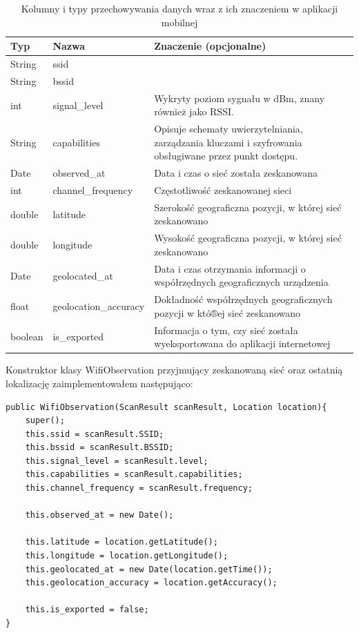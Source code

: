 \begin{table}
\caption{Kolumny i typy przechowywania danych wraz z ich znaczeniem w aplikacji mobilnej}
\label{table:mobiledbscheme}
\begin{tabular} { |l|l|p{7cm}|  }
\hline
Typ & Nazwa & Znaczenie (opcjonalne) \\
\hline
\hline
String & ssid & \\
\hline
String & bssid & \\
\hline
int & signal\_level & Wykryty poziom sygnału w dBm, znany również jako RSSI.\cite{scanResultAndroidDocs} \\
\hline
String & capabilities & Opisuje schematy uwierzytelniania, zarządzania kluczami i szyfrowania obsługiwane przez punkt dostępu.\cite{scanResultAndroidDocs} \\
\hline
Date & observed\_at & Data i czas o sieć została zeskanowana \\
\hline
int & channel\_frequency & Częstotliwość zeskanowanej sieci \\
\hline
double & latitude & Szerokość geograficzna pozycji, w której sieć zeskanowano \\
\hline
double & longitude & Wysokość geograficzna pozycji, w której sieć zeskanowano \\
\hline
Date & geolocated\_at & Data i czas otrzymania informacji o współrzędnych geograficznych urządzenia \\
\hline
float & geolocation\_accuracy & Dokładność współrzędnych geograficznych pozycji w któ®ej sieć zeskanowano \\
\hline
boolean & is\_exported & Informacja o tym, czy sieć została wyeksportowana do aplikacji internetowej \\
\hline
\end{tabular}
\end{table}

Konstruktor klasy WifiObservation przyjmujący zeskanowaną sieć oraz ostatnią lokalizację zaimplementowałem następująco:
\begin{verbatim}
public WifiObservation(ScanResult scanResult, Location location){
    super();
    this.ssid = scanResult.SSID;
    this.bssid = scanResult.BSSID;
    this.signal_level = scanResult.level;
    this.capabilities = scanResult.capabilities;
    this.channel_frequency = scanResult.frequency;

    this.observed_at = new Date();

    this.latitude = location.getLatitude();
    this.longitude = location.getLongitude();
    this.geolocated_at = new Date(location.getTime());
    this.geolocation_accuracy = location.getAccuracy();

    this.is_exported = false;
}
\end{verbatim}

